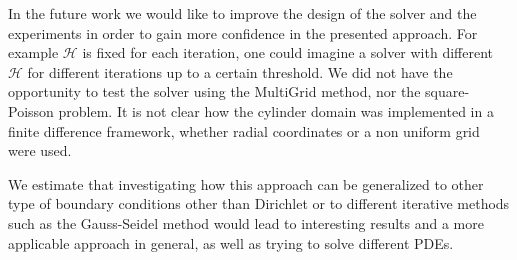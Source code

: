 \documentclass{article} %
\begin{document}
In the future work we would like to improve the design of the solver and the experiments in order to gain more confidence in the presented approach. For example $\mathcal{H}$ is fixed for each iteration, one could imagine a solver with different $\mathcal{H}$ for different iterations up to a certain threshold. We did not have the opportunity to test the solver using the MultiGrid method, nor the square-Poisson problem.
It is not clear how the cylinder domain was implemented in a finite difference framework, whether radial coordinates or a non uniform grid were used.

We estimate that investigating how this approach can be generalized to other type of boundary conditions other than Dirichlet or to different iterative methods such as the Gauss-Seidel method would lead to interesting results and a more applicable approach in general, as well as trying to solve different PDEs.



\end{document}
